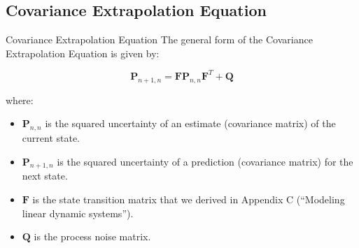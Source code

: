 \subsection{Covariance Extrapolation Equation}
\begin{frame}{Covariance Extrapolation Equation}
The general form of the Covariance Extrapolation Equation is given by:
\begin{minipage}{1\linewidth} %
\begin{exampleblock}{}{
\begin{equation*}
\mathbf{P}_{n+1,n} = \mathbf{F}\mathbf{P}_{n,n}\mathbf{F}^T + \mathbf{Q} \tag{2}
\end{equation*}

where:
\begin{itemize}
    \item $\mathbf{P}_{n,n}$ is the squared uncertainty of an estimate (covariance matrix) of the current state.
    \item $\mathbf{P}_{n+1,n}$ is the squared uncertainty of a prediction (covariance matrix) for the next state.
    \item $\mathbf{F}$ is the state transition matrix that we derived in Appendix C (“Modeling linear dynamic systems”).
    \item $\mathbf{Q}$ is the process noise matrix.
\end{itemize}}
\end{exampleblock}
\end{minipage}

\end{frame}

